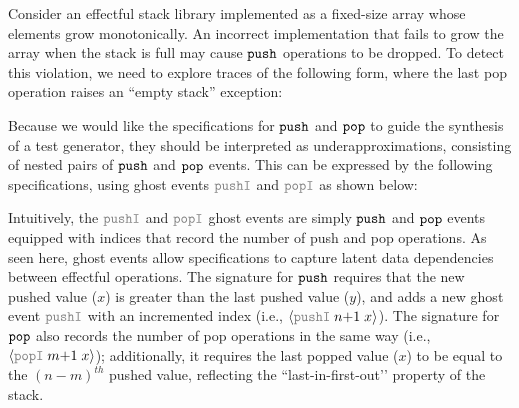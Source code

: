 
\begin{example}
  \label{ex:stack-example}
  Consider an effectful stack library implemented as a fixed-size
  array whose elements grow monotonically.  An incorrect implementation
  that fails to grow the array when the stack is full may cause
  $\boldsymbol{{\tt push}}$ operations to be dropped.  To detect this violation, we
  need to explore traces of the following form, where the last pop
  operation raises an ``empty stack'' exception:
  \vspace{-.6cm} \par{}\noindent
  Because we would like the \tyName{} specifications for $\boldsymbol{{\tt push}}$
  and $\boldsymbol{{\tt pop}}$ to guide the synthesis of a test generator, they
  should be interpreted as underapproximations, consisting of nested
  pairs of $\boldsymbol{{\tt push}}$ and $\boldsymbol{{\tt pop}}$ events. This can be expressed
  by the following \tyName{} specifications, using ghost events
  $\effGray{pushI}$ and $\effGray{popI}$ as shown below:
  \vspace{-.4cm} \par{}\vspace{-.5cm} \par\nobreak\noindent
  Intuitively, the $\effGray{pushI}$ and $\effGray{popI}$ ghost events are
  simply $\boldsymbol{{\tt push}}$ and $\boldsymbol{{\tt pop}}$ events equipped with indices that
  record the number of push and pop operations.  As seen here, ghost events allow \tyName{}
    specifications to capture latent data dependencies between effectful
    operations.   The signature for $\boldsymbol{{\tt push}}$ requires
  that the new pushed value ($x$) is greater than the last pushed value
  ($y$), and adds a new ghost event $\effGray{pushI}$ with an
  incremented index (i.e., $\msgAGray{pushI}{n{+}1\;x}$).
  The
  signature for $\boldsymbol{{\tt pop}}$ also records the number of pop operations
  in the same way (i.e., $\msgAGray{popI}{m{+}1\;x}$); additionally, it
  requires the last popped value ($x$) to be equal to the
  $(n{-}m)^{th}$ pushed value, reflecting the ``last-in-first-out’'
  property of the stack.
\end{example}
